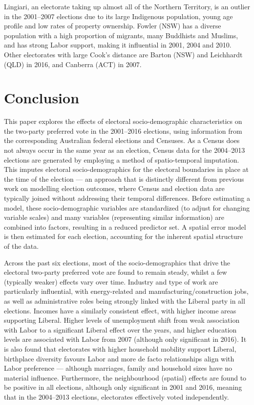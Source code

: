 \documentclass[11pt,a4paper,]{article}
\begin{document}
Lingiari, an electorate taking up almost all of the Northern Territory,
is an outlier in the 2001--2007 elections due to its large Indigenous
population, young age profile and low rates of property ownership.
Fowler (NSW) has a diverse population with a high proportion of
migrants, many Buddhists and Muslims, and has strong Labor support,
making it influential in 2001, 2004 and 2010. Other electorates with
large Cook's distance are Barton (NSW) and Leichhardt (QLD) in 2016, and
Canberra (ACT) in 2007.

\section{Conclusion}\label{conclusion}

This paper explores the effects of electoral socio-demographic
characteristics on the two-party preferred vote in the 2001--2016
elections, using information from the corresponding Australian federal
elections and Censuses. As a Census does not always occur in the same
year as an election, Census data for the 2004--2013 elections are
generated by employing a method of spatio-temporal imputation. This
imputes electoral socio-demographics for the electoral boundaries in
place at the time of the election --- an approach that is distinctly
different from previous work on modelling election outcomes, where
Census and election data are typically joined without addressing their
temporal differences. Before estimating a model, these socio-demographic
variables are standardized (to adjust for changing variable scales) and
many variables (representing similar information) are combined into
factors, resulting in a reduced predictor set. A spatial error model is
then estimated for each election, accounting for the inherent spatial
structure of the data.

Across the past six elections, most of the socio-demographics that drive
the electoral two-party preferred vote are found to remain steady,
whilst a few (typically weaker) effects vary over time. Industry and
type of work are particularly influential, with energy-related and
manufacturing/construction jobs, as well as administrative roles being
strongly linked with the Liberal party in all elections. Incomes have a
similarly consistent effect, with higher income areas supporting
Liberal. Higher levels of unemployment shift from weak association with
Labor to a significant Liberal effect over the years, and higher
education levels are associated with Labor from 2007 (although only
significant in 2016). It is also found that electorates with higher
household mobility support Liberal, birthplace diversity favours Labor
and more de facto relationships align with Labor preference --- although
marriages, family and household sizes have no material influence.
Furthermore, the neighbourhood (spatial) effects are found to be
positive in all elections, although only significant in 2001 and 2016,
meaning that in the 2004--2013 elections, electorates effectively voted
independently.
\end{document}

